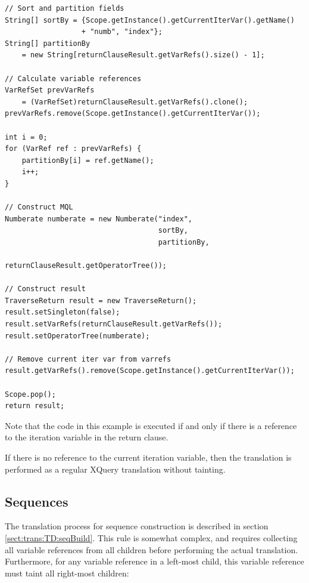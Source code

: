 \begin{Verbatim}
// Sort and partition fields
String[] sortBy = {Scope.getInstance().getCurrentIterVar().getName() 
		          + "numb", "index"};
String[] partitionBy 
	= new String[returnClauseResult.getVarRefs().size() - 1];

// Calculate variable references
VarRefSet prevVarRefs 
	= (VarRefSet)returnClauseResult.getVarRefs().clone();         
prevVarRefs.remove(Scope.getInstance().getCurrentIterVar());

int i = 0;
for (VarRef ref : prevVarRefs) {
    partitionBy[i] = ref.getName();
    i++;
}

// Construct MQL
Numberate numberate = new Numberate("index", 
                                    sortBy, 
                                    partitionBy, 
                                    returnClauseResult.getOperatorTree());

// Construct result
TraverseReturn result = new TraverseReturn();
result.setSingleton(false);
result.setVarRefs(returnClauseResult.getVarRefs());
result.setOperatorTree(numberate);

// Remove current iter var from varrefs
result.getVarRefs().remove(Scope.getInstance().getCurrentIterVar());

Scope.pop();
return result;
\end{Verbatim}

Note that the code in this example is executed if and only if
there is a reference to the iteration variable in the return clause.

If there is no reference to the current iteration variable, then the
translation is performed as a regular XQuery translation without tainting.

\subsection{Sequences}
\label{sect:impl:td:seq}
The translation process for sequence construction is described in section
\ref{sect:trans:TD:seqBuild}. This rule is somewhat complex, and requires
collecting all variable references from all children before performing the
actual translation. Furthermore, for any variable reference in a left-most
child, this variable reference must taint all right-most children:

